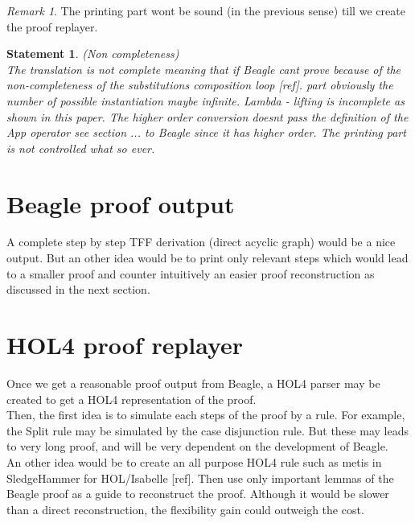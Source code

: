 \documentclass[a4paper, 11pt]{article}
\theoremstyle{plain}
\newtheorem*{stat}{Statement}
\theoremstyle{definition}
\theoremstyle{remark}
\newtheorem*{remark}{Remark}
\begin{document}
\begin{remark} The printing part wont be sound (in the previous sense) till we create the proof replayer.
\end{remark}

\begin{stat} (Non completeness)
\\The translation is not complete meaning that if Beagle cant prove 
because of the non-completeness of the substitutions composition loop [ref]. part obviously the number of possible instantiation maybe infinite. 
Lambda - lifting is incomplete as shown in this paper.
The higher order conversion doesnt pass the definition of the App operator see section ... to Beagle since it has higher order.
The printing part is not controlled what so ever.
\end{stat}

\section{Beagle proof output}
A complete step by step TFF derivation (direct acyclic graph) would be a nice output. But an other idea would be to print only relevant steps which would lead to a smaller proof and counter intuitively an easier proof reconstruction as discussed in the next section. 

\section{HOL4 proof replayer}
  Once we get a reasonable proof output from Beagle, a HOL4 parser may be created to get a HOL4 representation of the proof.
\\Then, the first idea is to simulate each steps of the proof by a rule. For example, the Split rule may be simulated by the case disjunction rule. But these may leads to very long proof, and will be very dependent on the development of Beagle.
\\An other idea would be to create an all purpose HOL4 rule such as metis in SledgeHammer for HOL/Isabelle [ref]. Then use only important lemmas of the Beagle proof as a guide to reconstruct the proof. Although it would be slower than a direct reconstruction, the flexibility gain could outweigh the cost.
\end{document}
